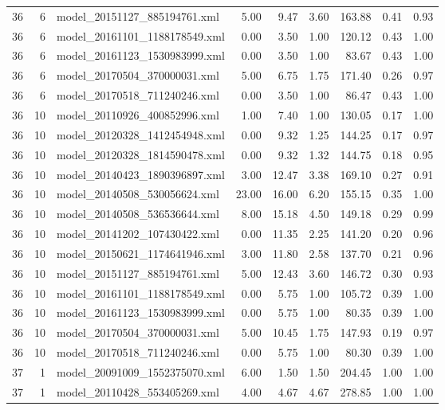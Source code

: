 \begin{table}[ht]
\begin{tabular}{rrlrrrrrr}
   36 &   6 & model\_20151127\_885194761.xml & 5.00 & 9.47 & 3.60 & 163.88 & 0.41 & 0.93 \\ 
   36 &   6 & model\_20161101\_1188178549.xml & 0.00 & 3.50 & 1.00 & 120.12 & 0.43 & 1.00 \\ 
   36 &   6 & model\_20161123\_1530983999.xml & 0.00 & 3.50 & 1.00 & 83.67 & 0.43 & 1.00 \\ 
   36 &   6 & model\_20170504\_370000031.xml & 5.00 & 6.75 & 1.75 & 171.40 & 0.26 & 0.97 \\ 
   36 &   6 & model\_20170518\_711240246.xml & 0.00 & 3.50 & 1.00 & 86.47 & 0.43 & 1.00 \\ 
   36 &  10 & model\_20110926\_400852996.xml & 1.00 & 7.40 & 1.00 & 130.05 & 0.17 & 1.00 \\ 
   36 &  10 & model\_20120328\_1412454948.xml & 0.00 & 9.32 & 1.25 & 144.25 & 0.17 & 0.97 \\ 
   36 &  10 & model\_20120328\_1814590478.xml & 0.00 & 9.32 & 1.32 & 144.75 & 0.18 & 0.95 \\ 
   36 &  10 & model\_20140423\_1890396897.xml & 3.00 & 12.47 & 3.38 & 169.10 & 0.27 & 0.91 \\ 
   36 &  10 & model\_20140508\_530056624.xml & 23.00 & 16.00 & 6.20 & 155.15 & 0.35 & 1.00 \\ 
   36 &  10 & model\_20140508\_536536644.xml & 8.00 & 15.18 & 4.50 & 149.18 & 0.29 & 0.99 \\ 
   36 &  10 & model\_20141202\_107430422.xml & 0.00 & 11.35 & 2.25 & 141.20 & 0.20 & 0.96 \\ 
   36 &  10 & model\_20150621\_1174641946.xml & 3.00 & 11.80 & 2.58 & 137.70 & 0.21 & 0.96 \\ 
   36 &  10 & model\_20151127\_885194761.xml & 5.00 & 12.43 & 3.60 & 146.72 & 0.30 & 0.93 \\ 
   36 &  10 & model\_20161101\_1188178549.xml & 0.00 & 5.75 & 1.00 & 105.72 & 0.39 & 1.00 \\ 
   36 &  10 & model\_20161123\_1530983999.xml & 0.00 & 5.75 & 1.00 & 80.35 & 0.39 & 1.00 \\ 
   36 &  10 & model\_20170504\_370000031.xml & 5.00 & 10.45 & 1.75 & 147.93 & 0.19 & 0.97 \\ 
   36 &  10 & model\_20170518\_711240246.xml & 0.00 & 5.75 & 1.00 & 80.30 & 0.39 & 1.00 \\ 
   37 &   1 & model\_20091009\_1552375070.xml & 6.00 & 1.50 & 1.50 & 204.45 & 1.00 & 1.00 \\ 
   37 &   1 & model\_20110428\_553405269.xml & 4.00 & 4.67 & 4.67 & 278.85 & 1.00 & 1.00 \\ 

\end{tabular}
\end{table}
